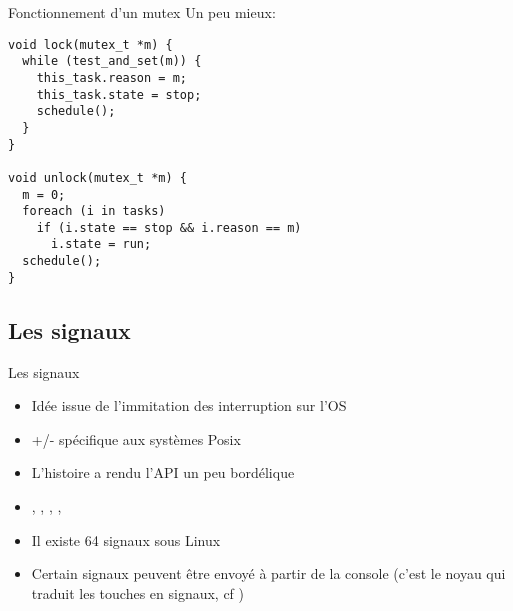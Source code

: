 \begin{frame}[fragile]{Fonctionnement d'un mutex}
  Un peu mieux:
  \begin{lstlisting}
void lock(mutex_t *m) {
  while (test_and_set(m)) {
    this_task.reason = m;
    this_task.state = stop;
    schedule();
  }
}

void unlock(mutex_t *m) {
  m = 0;
  foreach (i in tasks)
    if (i.state == stop && i.reason == m)
      i.state = run;
  schedule();
}
  \end{lstlisting}
\end{frame}

\subsection{Les signaux}

\begin{frame}[fragile=singleslide]{Les signaux}
  \begin{itemize}
  \item Idée issue de l'immitation des interruption sur l'OS
  \item +/- spécifique aux systèmes Posix
  \item L'histoire a rendu l'API un peu bordélique
  \item     {},     ,    ,
    , 
  \item Il existe 64 signaux sous Linux
  \item Certain  signaux peuvent  être envoyé à  partir de  la console
    (c'est  le   noyau  qui  traduit   les  touches  en   signaux,  cf
    )
  \end{itemize}
\end{frame}

